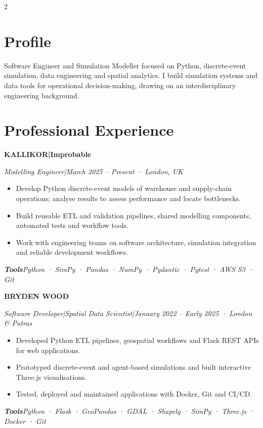 \documentclass[10pt,a4paper]{article}
\newcommand{\role}[3]{%
  {\large\bfseries\color{teal}#1}\par
  {\small\itshape\color{muted}#2\hspace{4pt}|\hspace{4pt}#3}\par\vspace{1pt}}
\begin{document}
\begin{paracol}{2}
\section*{Profile}
Software Engineer and Simulation Modeller focused on Python, discrete-event simulation,
data engineering and spatial analytics. I build simulation systems and data tools for
operational decision-making, drawing on an interdisciplinary engineering background.

\section*{Professional Experience}
\role{KALLIKOR\quad|\quad Improbable}{Modelling Engineer}{March 2025 -- Present · London, UK}
\begin{itemize}
\item Develop Python discrete-event models of warehouse and supply-chain operations; analyse results to assess performance and locate bottlenecks.
\item Build reusable ETL and validation pipelines, shared modelling components, automated tests and workflow tools.
\item Work with engineering teams on software architecture, simulation integration and reliable development workflows.
\end{itemize}
{\footnotesize\itshape\color{muted}\textbf{Tools}\quad Python · SimPy · Pandas · NumPy · Pydantic · Pytest · AWS S3 · Git}\par\vspace{5pt}

\role{BRYDEN WOOD}{Software Developer\quad|\quad Spatial Data Scientist}{January 2022 -- Early 2025 · London \& Patras}
\begin{itemize}
\item Developed Python ETL pipelines, geospatial workflows and Flask REST APIs for web applications.
\item Prototyped discrete-event and agent-based simulations and built interactive Three.js visualisations.
\item Tested, deployed and maintained applications with Docker, Git and CI/CD.
\end{itemize}
{\footnotesize\itshape\color{muted}\textbf{Tools}\quad Python · Flask · GeoPandas · GDAL · Shapely · SimPy · Three.js · Docker · Git}\par\vspace{5pt}


\end{paracol}
\end{document}
